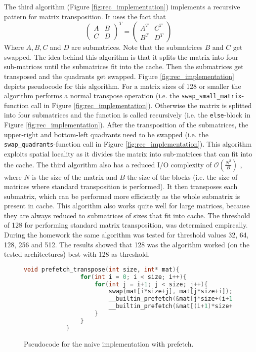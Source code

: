 \documentclass{scrartcl}
\begin{document}
    The third algorithm (Figure \ref{fig:rec_implementation}) implements a recursive pattern for matrix transposition. It uses the fact that 
    \begin{equation*}
        \begin{pmatrix}
            A & B \\
            C & D
        \end{pmatrix}^T = 
        \begin{pmatrix}
            A^T & C^T \\
            B^T & D^T
        \end{pmatrix}
    \end{equation*}
    Where $A, B, C$ and $D$ are submatrices. Note that the submatrices $B$ and $C$ get swapped. The idea behind this algorithm is that it splits the matrix into four sub-matrices until the submatrices fit into the cache. Then the submatrices get transposed and the quadrants get swapped. Figure \ref{fig:rec_implementation} depicts pseudocode for this algorithm. For a matrix sizes of 128 or smaller the algorithm performs a normal transpose operation (i.e. the \lstinline{swap_small_matrix}-function call in Figure \ref{fig:rec_implementation}). Otherwise the matrix is splitted into four submatrices and the function is called recursively (i.e. the \lstinline{else}-block in Figure \ref{fig:rec_implementation}). After the transposition of the submatrices, the upper-right and bottom-left quadrants need to be swapped (i.e. the \lstinline{swap_quadrants}-function call in Figure \ref{fig:rec_implementation}). This algorithm exploits spatial locality as it divides the matrix into sub-matrices that can fit into the cache. The third algorithm also has a reduced I/O complexity of $\mathcal{O}(\frac{N^2}{B})$ \cite{algorithmica}, where $N$ is the size of the matrix and $B$ the size of the blocks (i.e. the size of matrices where standard transposition is performed). It then transposes each submatrix, which can be performed more efficiently as the whole submatrix is present in cache. This algorithm also works quite well for large matrices, because they are always reduced to submatrices of sizes that fit into cache. The threshold of 128 for performing standard matrix transposition, was determined empircally. During the homework the same algorithm was tested for threshold values 32, 64, 128, 256 and 512. The results showed that 128 was the algorithm worked (on the tested architectures) best with 128 as threshold. 
    
    \begin{figure}
        \begin{lstlisting}[language=C]
            void prefetch_transpose(int size, int* mat){
                for(int i = 0; i < size; i++){
                    for(int j = i+1; j < size; j++){
                        swap(mat[i*size+j], mat[j*size+i]);
                        __builtin_prefetch(&mat[j*size+(i+1)], 1, 1);
                        __builtin_prefetch(&mat[(i+1)*size+j], 1, 1);
                    }
                }
            }
        \end{lstlisting}
        \caption{Pseudocode for the naive implementation with prefetch.}
        \label{fig:prefetch_implementation}        
    \end{figure}
\end{document}
